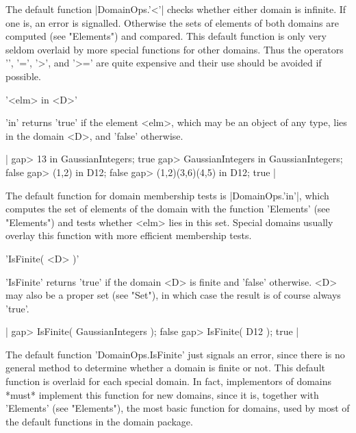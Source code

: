 The  default function  |DomainOps.'<'| checks  whether  either  domain is
infinite.   If  one  is,  an error  is signalled.  Otherwise  the sets of
elements  of both  domains  are computed  (see "Elements") and  compared.
This  default  function  is  only  very  seldom overlaid  by more special
functions for other domains.   Thus the  operators '\<', '\<=', '>',  and
'>=' are quite expensive and their use should be avoided if possible.

%

'<elm> in <D>'

'in' returns 'true' if the element  <elm>, which may  be an object of any
type, lies in the domain <D>, and 'false' otherwise.

|    gap> 13 in GaussianIntegers;
    true
    gap> GaussianIntegers in GaussianIntegers;
    false
    gap> (1,2) in D12;
    false
    gap> (1,2)(3,6)(4,5) in D12;
    true |

The default  function  for domain membership   tests is |DomainOps.'in'|,
which  computes  the set  of  elements of the  domain   with the function
'Elements' (see  "Elements") and tests whether   <elm> lies in  this set.
Special   domains usually overlay    this  function with more   efficient
membership tests.

%

'IsFinite( <D> )'

'IsFinite'  returns  'true' if  the   domain <D> is  finite  and  'false'
otherwise.  <D> may also be a proper  set (see "Set"),  in which case the
result is of course always 'true'.

|    gap> IsFinite( GaussianIntegers );
    false
    gap> IsFinite( D12 );
    true |

The default function 'DomainOps.IsFinite'  just signals  an error,  since
there is no general method to determine  whether  a  domain is  finite or
not.   This  default function is  overlaid  for  each special domain.  In
fact,  implementors  of domains *must*  implement this  function for  new
domains, since it is, together with 'Elements' (see "Elements"), the most
basic function for domains,  used by most of the default functions in the
domain package.

%

